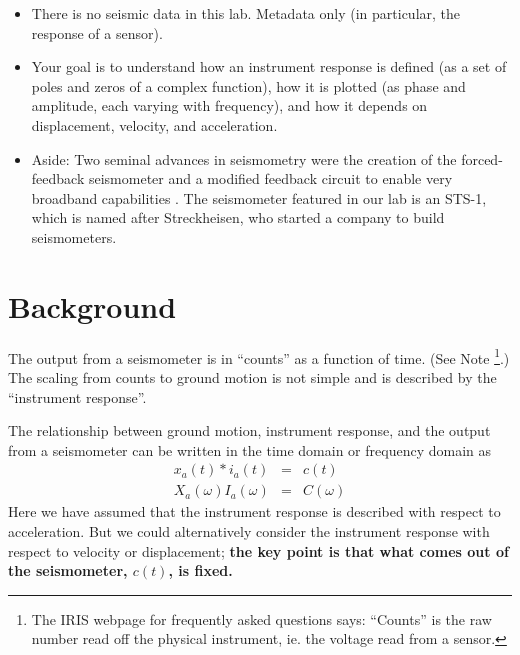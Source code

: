 \documentclass[11pt,titlepage,fleqn]{article}
\begin{document}
\begin{itemize}




\item There is no seismic data in this lab. Metadata only (in particular, the response of a sensor).


\item Your goal is to understand how an instrument response is defined (\eg as a set of poles and zeros of a complex function), how it is plotted (\eg as phase and amplitude, each varying with frequency), and how it depends on displacement, velocity, and acceleration.


\item Aside: Two seminal advances in seismometry were the creation of the forced-feedback seismometer \citep{WielandtStreckheisen1982} and a modified feedback circuit to enable very broadband capabilities \citep{WielandtSteim1986}. The seismometer featured in our lab is an STS-1, which is named after Streckheisen, who started a company to build seismometers.

\end{itemize}


\section{Background}

The output from a seismometer is in ``counts'' as a function of time. (See Note \footnote{The IRIS webpage for frequently asked questions says: ``Counts'' is the raw number read off the physical instrument, ie. the voltage read from a sensor.}.) The scaling from counts to ground motion is not simple and is described by the ``instrument response''.

The relationship between ground motion, instrument response, and the output from a seismometer can be written in the time domain or frequency domain as
%
\begin{eqnarray}
x_a(t) * i_a(t) &=& c(t)
\\
X_a(\omega) I_a(\omega) &=& C(\omega)
\end{eqnarray}
%
Here we have assumed that the instrument response is described with respect to acceleration. But we could alternatively consider the instrument response with respect to velocity or displacement; {\bf the key point is that what comes out of the seismometer, $c(t)$, is fixed.}
\end{document}
